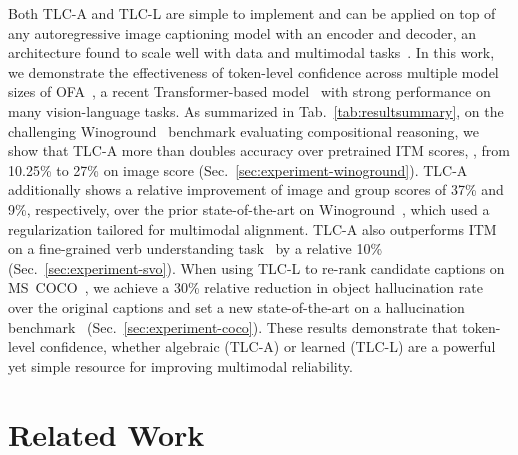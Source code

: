 \documentclass[10pt,twocolumn,letterpaper]{article}
\newcommand{\tabref}[1]{Tab.\xspace~\ref{#1}}
\newcommand{\secref}[1]{Sec.\xspace~\ref{#1}}
\newcommand{\ApproachName}{TLC\xspace}
\begin{document}
Both \ApproachName-A and \ApproachName-L are simple to implement and can be applied on top of any autoregressive image captioning model with an encoder and decoder, an architecture found to scale well with data and multimodal tasks~\cite{chen2022pali,ofa,wang2021simvlm,wang2022git}.
In this work, we demonstrate the effectiveness of token-level confidence across multiple model sizes of OFA~\cite{ofa}, a recent Transformer-based model~\cite{vaswani2017attention} with strong performance on many vision-language tasks. As summarized in \tabref{tab:resultsummary}, on the challenging Winoground~\cite{thrush_and_ross2022winoground} benchmark evaluating compositional reasoning, we show that \ApproachName-A more than doubles accuracy over pretrained ITM scores, \eg, from 10.25\% to 27\% on image score (\secref{sec:experiment-winoground}). \ApproachName-A additionally shows a relative improvement of image and group scores of 37\% and 9\%, respectively, over the prior state-of-the-art on Winoground~\cite{ren2021learning}, which used a regularization tailored for multimodal alignment. \ApproachName-A also outperforms ITM on a fine-grained verb understanding task~\cite{hendricks2021probing} by a relative 10\% (\secref{sec:experiment-svo}). When using \ApproachName-L to re-rank candidate captions on MS~COCO~\cite{chen2015microsoft}, we achieve a 30\% relative reduction in object hallucination rate over the original captions and set a new state-of-the-art on a hallucination benchmark~\cite{rohrbach2018emnlp} (\secref{sec:experiment-coco}).
These results demonstrate that token-level confidence, whether algebraic (\ApproachName-A) or learned (\ApproachName-L) are a powerful yet simple resource for improving multimodal reliability.

\section{Related Work}
\label{sec:relatedwork}
\end{document}
